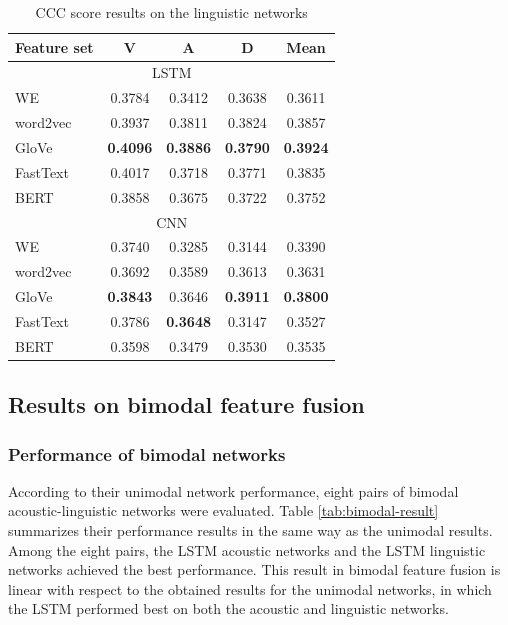 \begin{table}[htpb]
  \caption{CCC score results on the linguistic networks}
  \begin{center}
 \label{tab:text-result}
 \begin{tabular}{l c c c c}
 \hline
Feature set & V & A & D & Mean \\
\hline \hline
\multicolumn{5}{c}{LSTM} \\ 
WE       & 0.3784  & 0.3412 & 0.3638 & 0.3611 \\
word2vec & 0.3937  & 0.3811  & 0.3824  & 0.3857 \\
GloVe    & \textbf{0.4096} & \textbf{0.3886} & \textbf{0.3790} &
\textbf{0.3924} \\
FastText & 0.4017 & 0.3718 & 0.3771 & 0.3835 \\
BERT     & 0.3858  & 0.3675  & 0.3722  & 0.3752 \\
 \hline
\multicolumn{5}{c}{CNN} \\
WE       & 0.3740 & 0.3285 & 0.3144 & 0.3390 \\
word2vec & 0.3692  & 0.3589  & 0.3613  & 0.3631 \\
GloVe    & \textbf{0.3843} & 0.3646 & \textbf{0.3911} & \textbf{0.3800} \\
FastText & 0.3786 & \textbf{0.3648} & 0.3147 & 0.3527 \\
BERT     & 0.3598  & 0.3479  & 0.3530  & 0.3535 \\
 \hline
 \end{tabular}
\end{center}
\end{table} 

\subsection{Results on bimodal feature fusion}
\subsubsection{Performance of bimodal networks}
According to their unimodal network performance, eight pairs of bimodal
acoustic-linguistic networks were evaluated. Table \ref{tab:bimodal-result}
summarizes their performance results in the same way as the unimodal
results.  Among the eight pairs, the LSTM acoustic networks and the LSTM
linguistic networks achieved the best performance. This result in bimodal
feature fusion is linear with respect to the obtained results for the unimodal
networks, in which the LSTM performed best on both the acoustic and linguistic
networks. 

